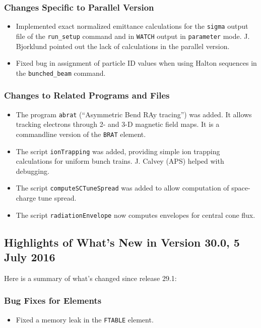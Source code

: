 \documentclass[11pt]{article}
\begin{document}
\subsubsection{Changes Specific to Parallel Version}

\begin{itemize}
\item Implemented exact normalized emittance calculations for the \verb|sigma| output file of the \verb|run_setup| command and in \verb|WATCH|
  output in \verb|parameter| mode. J. Bjorklund pointed out the lack of calculations in the parallel version.
\item Fixed bug in assignment of particle ID values when using Halton sequences in the \verb|bunched_beam| command.
\end{itemize}

\subsubsection{Changes to Related Programs and Files}

\begin{itemize}
\item The program \verb|abrat| (``Asymmetric Bend RAy tracing'') was added. It allows tracking electrons through 2- and 3-D magnetic field maps.
  It is a commandline version of the \verb|BRAT| element.
\item The script \verb|ionTrapping| was added, providing simple ion trapping calculations for uniform bunch trains. J. Calvey (APS) helped with
  debugging.
\item The script \verb|computeSCTuneSpread| was added to allow computation of space-charge tune spread.
\item The script \verb|radiationEnvelope| now computes envelopes for central cone flux.
\end{itemize}

\subsection{Highlights of What's New in Version 30.0, 5 July 2016}

Here is a summary of what's changed since release 29.1:

\subsubsection{Bug Fixes for Elements}

\begin{itemize}
\item Fixed a memory leak in the \verb|FTABLE| element.
\end{itemize}
\end{document}
